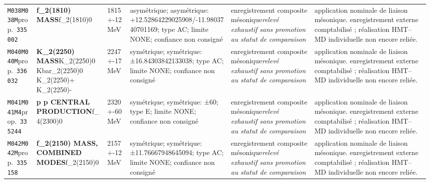 \begin{landscape}
\begin{longtable}{L{1.85cm}L{4.45cm}L{2.35cm}L{4.05cm}L{3.35cm}L{7.15cm}}
\texttt{M038}\newline \texttt{M038M}\newline prop.\ \texttt{335002} & \textbf{f\_\allowbreak{}2(1810) MASS}\newline f\_\allowbreak{}2(1810)0 & 1815+-12\,MeV & asymétrique; asymétrique: +12.52864229025908/-11.9803740701169; type AC; limite NONE; confiance non consigné & enregistrement composite mésonique\newline \emph{relevé exhaustif sans promotion au statut de comparaison} & application nominale de liaison mésonique. enregistrement externe comptabilisé ; réalisation HMT--MD individuelle non encore reliée. \\
\texttt{M040}\newline \texttt{M040M}\newline prop.\ \texttt{336032} & \textbf{K\_\allowbreak{}2(2250) MASS}\newline K\_\allowbreak{}2(2250)0 \textbar{}\allowbreak{} Kbar\_\allowbreak{}2(2250)0 \textbar{}\allowbreak{} K\_\allowbreak{}2(2250)+ \textbar{}\allowbreak{} K\_\allowbreak{}2(2250)- & 2247+-17\,MeV & symétrique; symétrique: ±16.84303842133038; type AC; limite NONE; confiance non consigné & enregistrement composite mésonique\newline \emph{relevé exhaustif sans promotion au statut de comparaison} & application nominale de liaison mésonique. enregistrement externe comptabilisé ; réalisation HMT--MD individuelle non encore reliée. \\
\texttt{M041}\newline \texttt{M041M4}\newline prop.\ \texttt{335244} & \textbf{p p CENTRAL PRODUCTION}\newline f\_\allowbreak{}4(2300)0 & 2320+-60\,MeV & symétrique; symétrique: ±60; type E; limite NONE; confiance non consigné & enregistrement composite mésonique\newline \emph{relevé exhaustif sans promotion au statut de comparaison} & application nominale de liaison mésonique. enregistrement externe comptabilisé ; réalisation HMT--MD individuelle non encore reliée. \\
\texttt{M042}\newline \texttt{M042M}\newline prop.\ \texttt{335158} & \textbf{f\_\allowbreak{}2(2150) MASS, COMBINED MODES}\newline f\_\allowbreak{}2(2150)0 & 2157+-12\,MeV & symétrique; symétrique: ±11.76667948645094; type AC; limite NONE; confiance non consigné & enregistrement composite mésonique\newline \emph{relevé exhaustif sans promotion au statut de comparaison} & application nominale de liaison mésonique. enregistrement externe comptabilisé ; réalisation HMT--MD individuelle non encore reliée. \\

\end{longtable}
\end{landscape}
